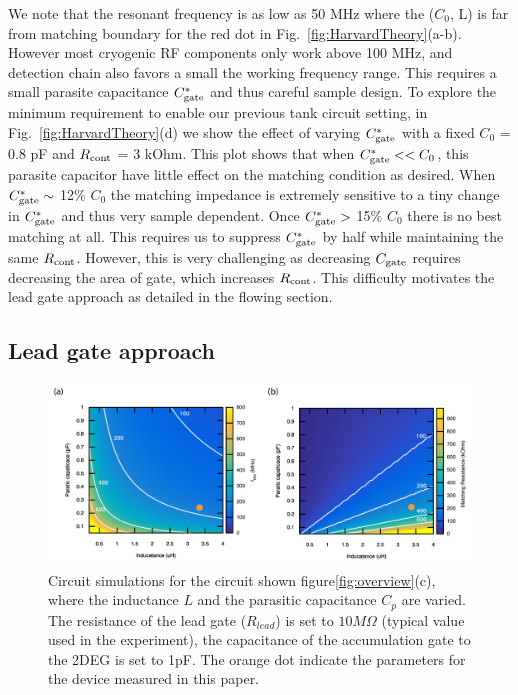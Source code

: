 \documentclass[]{article}
\begin{document}
	
	We note that the resonant frequency is as low as 50 MHz where the ($C_0$, L) is far from matching boundary for the red dot in Fig.\ \ref{fig:HarvardTheory}(a-b). However most cryogenic RF components only work above 100 MHz, and detection chain also favors a small the working frequency range. This requires a small parasite capacitance $C^*_{\rm gate} $ and thus careful sample design. To explore the minimum requirement to enable our previous tank circuit setting, in Fig.\ \ref{fig:HarvardTheory}(d) we show the effect of varying $C^*_{\rm gate}$ with a fixed $C_0$ = 0.8 pF and $R_{\rm cont}$ = 3 kOhm.  This plot shows that when  $C^*_{\rm gate} << C_0$, this parasite capacitor have little effect on the matching condition as desired. When $C^*_{\rm gate} \sim $ 12\% $C_0$ the matching impedance is extremely sensitive to a tiny change in $C^*_{\rm gate}$ and thus very sample dependent. Once $C^*_{\rm gate}>$ 15\% $C_0$ there is no best matching at all.  This requires us to suppress $C^*_{\rm gate}$ by half while maintaining the same $R_{\rm cont}$. However, this is very challenging as decreasing $C_{\rm gate}$ requires decreasing the area of gate, which increases $R_{\rm cont}$. This difficulty motivates the lead gate approach as detailed in the flowing section.


\subsection{Lead gate approach} %
	\label{sub:lead_gate_approach}
	
	\begin{figure}
		\includegraphics[width=\textwidth]{Illustrations/Theory_figure/theory_delft_v3.pdf}
		\caption{Circuit simulations for the circuit shown figure\ref{fig:overview}(c), where the inductance $L$ and the parasitic capacitance $C_p$ are varied. The resistance of the lead gate ($R_{lead}$) is set to $10M\Omega$ (typical value used in the experiment), the capacitance of the accumulation gate to the 2DEG is set to 1pF. The orange dot indicate the parameters for the device measured in this paper.}
		\label{fig:lead_gate_theory}
	\end{figure}
\end{document}
